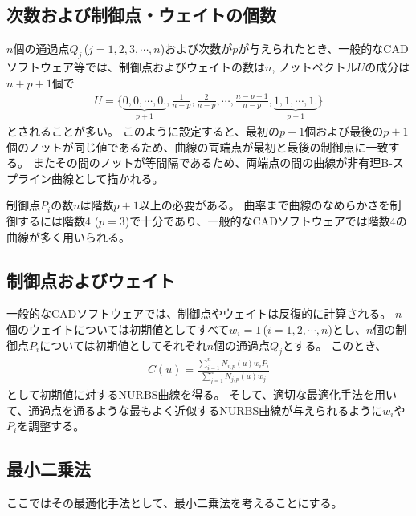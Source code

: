 \subsection{次数および制御点・ウェイトの個数}
$n$個の通過点$Q_j$\,($j = 1, 2, 3, \cdots, n$)および次数が$p$が与えられたとき、一般的なCADソフトウェア等では、制御点およびウェイトの数は$n$, ノットベクトル$U$の成分は$n+p+1$個で
\begin{align*}
  U = \bigg\{
      \underbrace{0, 0, \cdots, 0\bigg.}_{p+1},
      \frac1{n-p}, \frac2{n-p}, \cdots, \frac{n-p-1}{n-p},
      \underbrace{1, 1, \cdots, 1\bigg.}_{p+1}
      \bigg\}
\end{align*}
とされることが多い。
このように設定すると、最初の$p+1$個および最後の$p+1$個のノットが同じ値であるため、曲線の両端点が最初と最後の制御点に一致する。
またその間のノットが等間隔であるため、両端点の間の曲線が非有理B-スプライン曲線として描かれる。
\begin{hosoku}
制御点$P_i$の数$n$は階数$p+1$以上の必要がある。
曲率まで曲線のなめらかさを制御するには階数4 ($p = 3$)で十分であり、一般的なCADソフトウェアでは階数4の曲線が多く用いられる。
\end{hosoku}


\subsection{制御点およびウェイト}
一般的なCADソフトウェアでは、制御点やウェイトは反復的に計算される。
$n$個のウェイトについては初期値としてすべて$w_i = 1$\,($i = 1, 2, \cdots, n$)とし、$n$個の制御点$P_i$については初期値としてそれぞれ$n$個の通過点$Q_j$とする。
このとき、
\begin{align*}
  C(u) = \frac{\displaystyle\sum_{i=1}^nN_{i, p}(u)w_iP_i}{\displaystyle\sum_{j=1}^nN_{j, p}(u)w_j}
\end{align*}
として初期値に対するNURBS曲線を得る。
そして、適切な最適化手法を用いて、通過点を通るような最もよく近似するNURBS曲線が与えられるように$w_i$や$P_i$を調整する。


\clearpage
\subsection{最小二乗法\TBW}
ここではその最適化手法として、最小二乗法を考えることにする。


